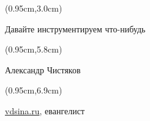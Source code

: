 \documentclass[xetex,18pt,aspectratio=43]{beamer}
\title[Давайте инструментируем что-нибудь]{}
\author[Александр Чистяков, vdsina.ru]{}
\date{}
\newcommand\Bigfont{\fontsize{20}{20}\selectfont}
\newcommand\Authorfont{\fontsize{17}{17}\selectfont}
\newcommand\Orgfont{\fontsize{13}{13}\selectfont}
\begin{document}
{ %
    \begin{frame}[plain]
      \begin{textblock*}{\framewidth}(0.95cm,3.0cm) %
        \Bigfont
          \begin{center}
          Давайте инструментируем что-нибудь
          \end{center}
      \end{textblock*}
      \begin{textblock*}{\framewidth}(0.95cm,5.8cm) %
        \Authorfont
          \begin{center}
          Александр Чистяков
          \end{center}
      \end{textblock*}
      \begin{textblock*}{\framewidth}(0.95cm,6.9cm) %
        \Orgfont
          \begin{center}
          \href{https://vdsina.ru}{\color{blue}vdsina.ru}, евангелист
          \end{center}
      \end{textblock*}
     \end{frame}
}
\end{document}
